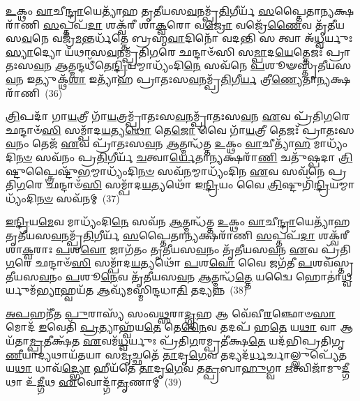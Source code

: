 \-\ul{𑌉}\-𑌕𑍍𑌥𑌂 \ul{𑌵𑌾}\-𑌚𑍀\-\ul{𑌨𑍍𑌦𑍍𑌰𑌾}\-𑌯𑍇𑌤𑍍𑌯𑌾᳴𑌹 𑌤𑍃𑌤𑍀𑌯𑌸\-\ul{𑌵}\-𑌨𑌮𑍍𑌪𑍍𑌰᳴\-\ul{𑌤𑌿}\-𑌗𑍀𑌰𑍍𑌯᳴ \ul{𑌸}\-𑌪𑍍𑌤𑍈𑌤𑌾\-\ul{𑌨𑍍𑌯}\-𑌕𑍍𑌷𑌰𑌾᳴𑌣𑌿 \ul{𑌸}\-𑌪𑍍𑌤𑌪᳴\-\ul{𑌦𑌾} 𑌶𑌕𑍍𑌵᳴𑌰𑍀 𑌶𑌾\-\ul{𑌕𑍍𑌵}\-𑌰𑍋 𑌵\-\ul{𑌜𑍍𑌰𑍋} 𑌵𑌜𑍍𑌰𑍇᳴\-\ul{𑌣𑍈}\-𑌵 𑌤𑍃᳴𑌤𑍀𑌯𑌸\-\ul{𑌵}\-𑌨𑍇 𑌵𑌜𑍍𑌰᳴\-\ul{𑌮}\-𑌨𑍍𑌤𑌰𑍍𑌧᳴𑌤𑍍𑌤𑍇 𑌬𑍍𑌰𑌹𑍍𑌮\-\ul{𑌵𑌾}\-𑌦𑌿𑌨𑍋᳴ 𑌵𑌦𑌨𑍍𑌤𑌿 𑌸 𑌤𑍍𑌵𑌾 𑌅᳴\-\ul{𑌧𑍍𑌵}\-𑌰𑍍𑌯𑍁𑌃 \ul{𑌸𑍍𑌯𑌾}\-𑌦𑍍𑌯𑍋 𑌯᳴𑌥𑌾𑌸\-\ul{𑌵}\-𑌨𑌮𑍍𑌪𑍍𑌰᳴𑌤𑌿\-\ul{𑌗}\-𑌰𑍇 𑌛𑌨𑍍𑌦𑌾𑍞᳴𑌸𑌿 𑌸\-\ul{𑌮𑍍𑌪𑌾}\-𑌦\-\ul{𑌯𑍇}\-𑌤𑍍𑌤𑍇𑌜𑌃᳴ 𑌪𑍍𑌰𑌾𑌤𑌃𑌸\-\ul{𑌵}\-𑌨 \ul{𑌆}\-𑌤𑍍𑌮𑌨𑍍𑌦𑌧𑍀᳴𑌤𑍇\-\ul{𑌨𑍍𑌦𑍍𑌰𑌿}\-𑌯𑌮𑍍𑌮𑌾𑌧𑍍𑌯𑌂᳴𑌦𑌿\-\ul{𑌨𑍇} 𑌸𑌵᳴𑌨𑍇 \ul{𑌪}\-𑌶𑍂𑍟𑌸𑍍𑌤𑍃᳴𑌤𑍀𑌯𑌸\-\ul{𑌵}\-𑌨 𑌇𑌤𑍍𑌯𑍁𑌕𑍍𑌥᳴\-\ul{𑌶𑌾} 𑌇𑌤𑍍𑌯𑌾᳴𑌹 𑌪𑍍𑌰𑌾𑌤𑌃𑌸\-\ul{𑌵}\-𑌨𑌮𑍍𑌪𑍍𑌰᳴\-\ul{𑌤𑌿}\-𑌗𑍀\-\ul{𑌰𑍍𑌯} 𑌤𑍍𑌰𑍀\-\ul{𑌣𑍍𑌯𑍇}\-𑌤𑌾\-\ul{𑌨𑍍𑌯}\-𑌕𑍍𑌷𑌰𑌾᳴𑌣𑌿~(36)

\-\ul{𑌤𑍍𑌰𑌿}\-𑌪𑌦𑌾᳴ 𑌗𑌾\-\ul{𑌯}\-𑌤𑍍𑌰𑍀 𑌗𑌾᳴\-\ul{𑌯}\-𑌤𑍍𑌰𑌮𑍍𑌪𑍍𑌰𑌾᳴𑌤𑌃𑌸\-\ul{𑌵}\-𑌨𑌮𑍍𑌪𑍍𑌰𑌾᳴𑌤𑌃𑌸\-\ul{𑌵}\-𑌨 \ul{𑌏}\-𑌵 𑌪𑍍𑌰᳴𑌤𑌿\-\ul{𑌗}\-𑌰𑍇 𑌛𑌨𑍍𑌦𑌾𑍞᳴\-\ul{𑌸𑌿} 𑌸𑌮𑍍𑌪𑌾᳴𑌦\-\ul{𑌯}\-𑌤𑍍𑌯\-\ul{𑌥𑍋} 𑌤𑍇\-\ul{𑌜𑍋} 𑌵𑍈 𑌗𑌾᳴\-\ul{𑌯}\-𑌤𑍍𑌰𑍀 𑌤𑍇𑌜𑌃᳴ 𑌪𑍍𑌰𑌾𑌤𑌃𑌸\-\ul{𑌵}\-𑌨𑌂 𑌤𑍇𑌜᳴ \ul{𑌏}\-𑌵 𑌪𑍍𑌰𑌾᳴𑌤𑌃𑌸\-\ul{𑌵}\-𑌨 \ul{𑌆}\-𑌤𑍍𑌮𑌨𑍍𑌧᳴𑌤𑍍𑌤 \ul{𑌉}\-𑌕𑍍𑌥𑌂 \ul{𑌵𑌾}\-𑌚𑍀𑌤𑍍𑌯𑌾᳴\-\ul{𑌹} 𑌮𑌾𑌧𑍍𑌯𑌂᳴𑌦𑌿\-\ul{𑌨}\-\-\ul{𑍞} 𑌸𑌵᳴𑌨𑌂 𑌪𑍍𑌰\-\ul{𑌤𑌿}\-𑌗𑍀𑌰𑍍𑌯᳴ \ul{𑌚}\-𑌤𑍍𑌵𑌾\-\ul{𑌰𑍍𑌯𑍇}\-𑌤𑌾\-\ul{𑌨𑍍𑌯}\-𑌕𑍍𑌷𑌰𑌾᳴\-\ul{𑌣𑌿} 𑌚𑌤𑍁᳴𑌷𑍍𑌪𑌦𑌾 \ul{𑌤𑍍𑌰𑌿}\-𑌷𑍍𑌟𑍁𑌪𑍍𑌤𑍍𑌰𑍈𑌷𑍍𑌟𑍁᳴\-\ul{𑌭}\-𑌮𑍍𑌮𑌾𑌧𑍍𑌯𑌂᳴𑌦𑌿\-\ul{𑌨}\-\-\ul{𑍞} 𑌸𑌵᳴\-\ul{𑌨}\-𑌮𑍍𑌮𑌾𑌧𑍍𑌯𑌂᳴𑌦𑌿𑌨 \ul{𑌏}\-𑌵 𑌸𑌵᳴𑌨𑍇 𑌪𑍍𑌰𑌤𑌿\-\ul{𑌗}\-𑌰𑍇 𑌛𑌨𑍍𑌦𑌾𑍞᳴\-\ul{𑌸𑌿} 𑌸𑌮𑍍𑌪𑌾᳴𑌦\-\ul{𑌯}\-𑌤𑍍𑌯𑌥𑍋᳴ 𑌇\-\ul{𑌨𑍍𑌦𑍍𑌰𑌿}\-𑌯𑌂 𑌵𑍈 \ul{𑌤𑍍𑌰𑌿}\-𑌷𑍍𑌟𑍁𑌗𑌿᳴\-\ul{𑌨𑍍𑌦𑍍𑌰𑌿}\-𑌯𑌮𑍍𑌮𑌾𑌧𑍍𑌯𑌂᳴𑌦𑌿\-\ul{𑌨}\-\-\ul{𑍞} 𑌸𑌵᳴𑌨𑌮𑍍~(37)

\-\ul{𑌇}\-\-\ul{𑌨𑍍𑌦𑍍𑌰𑌿}\-𑌯\-\ul{𑌮𑍇}\-𑌵 𑌮𑌾𑌧𑍍𑌯𑌂᳴𑌦𑌿\-\ul{𑌨𑍇} 𑌸𑌵᳴𑌨 \ul{𑌆}\-𑌤𑍍𑌮𑌨𑍍𑌧᳴𑌤𑍍𑌤 \ul{𑌉}\-𑌕𑍍𑌥𑌂 \ul{𑌵𑌾}\-𑌚𑍀\-\ul{𑌨𑍍𑌦𑍍𑌰𑌾}\-𑌯𑍇𑌤𑍍𑌯𑌾᳴𑌹 𑌤𑍃𑌤𑍀𑌯𑌸\-\ul{𑌵}\-𑌨𑌮𑍍𑌪𑍍𑌰᳴\-\ul{𑌤𑌿}\-𑌗𑍀𑌰𑍍𑌯᳴ \ul{𑌸}\-𑌪𑍍𑌤𑍈𑌤𑌾\-\ul{𑌨𑍍𑌯}\-𑌕𑍍𑌷𑌰𑌾᳴𑌣𑌿 \ul{𑌸}\-𑌪𑍍𑌤𑌪᳴\-\ul{𑌦𑌾} 𑌶𑌕𑍍𑌵᳴𑌰𑍀 𑌶𑌾\-\ul{𑌕𑍍𑌵}\-𑌰𑌾𑌃 \ul{𑌪}\-𑌶\-\ul{𑌵𑍋} 𑌜𑌾𑌗᳴𑌤𑌂 𑌤𑍃𑌤𑍀𑌯𑌸\-\ul{𑌵}\-𑌨𑌂 𑌤𑍃᳴𑌤𑍀𑌯𑌸\-\ul{𑌵}\-𑌨 \ul{𑌏}\-𑌵 𑌪𑍍𑌰᳴𑌤𑌿\-\ul{𑌗}\-𑌰𑍇 𑌛𑌨𑍍𑌦𑌾𑍞᳴\-\ul{𑌸𑌿} 𑌸𑌮𑍍𑌪𑌾᳴𑌦\-\ul{𑌯}\-𑌤𑍍𑌯𑌥𑍋᳴ \ul{𑌪}\-𑌶\-\ul{𑌵𑍋} 𑌵𑍈 𑌜𑌗᳴𑌤𑍀 \ul{𑌪}\-𑌶𑌵᳴𑌸𑍍𑌤𑍃𑌤𑍀𑌯𑌸\-\ul{𑌵}\-𑌨𑌂 \ul{𑌪}\-𑌶𑍂\-\ul{𑌨𑍇}\-𑌵 𑌤𑍃᳴𑌤𑍀𑌯𑌸\-\ul{𑌵}\-𑌨 \ul{𑌆}\-𑌤𑍍𑌮𑌨𑍍𑌧᳴\-\ul{𑌤𑍍𑌤𑍇} 𑌯𑌦𑍍𑌵𑍈 𑌹𑍋𑌤𑌾॑\-\ul{𑌧𑍍𑌵}\-𑌰𑍍𑌯𑍁𑌮᳴\-\ul{𑌭𑍍𑌯𑌾}\-𑌹𑍍𑌵𑌯᳴𑌤 \ul{𑌆}\-𑌵𑍍𑌯᳴𑌮𑌸𑍍𑌮𑌿𑌨𑍍𑌦𑌧𑌾\-\ul{𑌤𑌿} 𑌤𑌦𑍍𑌯𑌨𑍍𑌨~(38)

\-\ul{𑌅}\-\-\ul{𑌪}\-𑌹𑌨𑍀᳴𑌤 \ul{𑌪𑍁}\-𑌰𑌾𑌸𑍍𑌯᳴ 𑌸𑌂𑌵\-\ul{𑌥𑍍𑌸}\-𑌰𑌾\-\ul{𑌦𑍍𑌗𑍃}\-𑌹 𑌆 𑌵𑍇᳴𑌵𑍀\-\ul{𑌰}\-𑌞𑍍𑌛𑍋𑍞\-\ul{𑌸𑌾} 𑌮𑍋𑌦᳴ \ul{𑌇}\-𑌵𑍇𑌤𑌿᳴ \ul{𑌪𑍍𑌰}\-𑌤𑍍𑌯𑌾𑌹𑍍𑌵᳴𑌯\-\ul{𑌤𑍇} 𑌤𑍇\-\ul{𑌨𑍈}\-𑌵 𑌤𑌦𑌪᳴ 𑌹\-\ul{𑌤𑍇} 𑌯\-\ul{𑌥𑌾} 𑌵𑌾 𑌆𑌯᳴𑌤𑌾\-\ul{𑌮𑍍𑌪𑍍𑌰}\-𑌤𑍀𑌕𑍍𑌷᳴𑌤 \ul{𑌏}\-𑌵𑌮᳴\-\ul{𑌧𑍍𑌵}\-𑌰𑍍𑌯𑍁𑌃 𑌪𑍍𑌰᳴𑌤𑌿\-\ul{𑌗}\-𑌰𑌮𑍍𑌪𑍍𑌰𑌤𑍀॑𑌕𑍍𑌷\-\ul{𑌤𑍇} 𑌯𑌦᳴𑌭𑌿𑌪𑍍𑌰𑌤𑌿𑌗𑍃\-\ul{𑌣𑍀}\-𑌯𑌾𑌦𑍍𑌯𑌥𑌾𑌯᳴𑌤𑌯𑌾 𑌸\-\ul{𑌮𑍃}\-𑌚𑍍𑌛𑌤𑍇᳴ \ul{𑌤𑌾}\-𑌦𑍃\-\ul{𑌗𑍇}\-𑌵 𑌤𑌦𑍍𑌯𑌦᳴\-\ul{𑌰𑍍𑌧}\-𑌰𑍍𑌚𑌾𑌲𑍍𑌲𑍁𑌪𑍍𑌯𑍇᳴\-\ul{𑌤} 𑌯\-\ul{𑌥𑌾} 𑌧𑌾𑌵᳴\-\ul{𑌦𑍍𑌭𑍍𑌯𑍋} 𑌹𑍀𑌯᳴𑌤𑍇 \ul{𑌤𑌾}\-𑌦𑍃\-\ul{𑌗𑍇}\-𑌵 𑌤\-\ul{𑌤𑍍𑌪𑍍𑌰}\-𑌬𑌾\-\ul{𑌹𑍁}\-𑌗𑍍𑌵𑌾 \ul{𑌋}\-𑌤𑍍𑌵𑌿𑌜𑌾᳴𑌮𑍁\-\ul{𑌦𑍍𑌗𑍀}\-𑌥𑌾 𑌉᳴\-\ul{𑌦𑍍𑌗𑍀}\-𑌥 \ul{𑌏}\-𑌵𑍋𑌦𑍍𑌗𑌾᳴\-\ul{𑌤𑍃}\-𑌣𑌾𑌮𑍍~(39)

